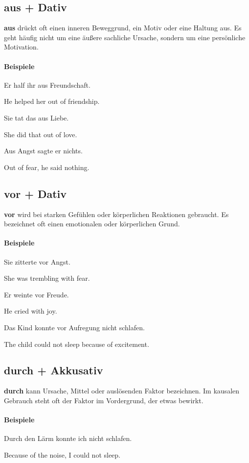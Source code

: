 \documentclass[a4paper]{article}
\newcommand{\EN}[1]{\par{\small\textcolor{TranslationGray}{#1}}\vspace{0.25em}}
\begin{document}
    \subsection{aus + Dativ}
    \textbf{aus} drückt oft einen inneren Beweggrund, ein Motiv oder eine Haltung aus. Es geht häufig nicht um eine äußere sachliche Ursache, sondern um eine persönliche Motivation.
    
    \paragraph{Beispiele}
        Er half ihr aus Freundschaft.\\
        \EN{He helped her out of friendship.}
        
        Sie tat das aus Liebe.\\
        \EN{She did that out of love.}
        
        Aus Angst sagte er nichts.\\
        \EN{Out of fear, he said nothing.}
    
    \subsection{vor + Dativ}
    \textbf{vor} wird bei starken Gefühlen oder körperlichen Reaktionen gebraucht. Es bezeichnet oft einen emotionalen oder körperlichen Grund.
    
    \paragraph{Beispiele}
        Sie zitterte vor Angst.\\
        \EN{She was trembling with fear.}
        
        Er weinte vor Freude.\\
        \EN{He cried with joy.}
        
        Das Kind konnte vor Aufregung nicht schlafen.\\
        \EN{The child could not sleep because of excitement.}
    
    \subsection{durch + Akkusativ}
    \textbf{durch} kann Ursache, Mittel oder auslösenden Faktor bezeichnen. Im kausalen Gebrauch steht oft der Faktor im Vordergrund, der etwas bewirkt.
    
    \paragraph{Beispiele}
        Durch den Lärm konnte ich nicht schlafen.\\
        \EN{Because of the noise, I could not sleep.}
        
\end{document}
